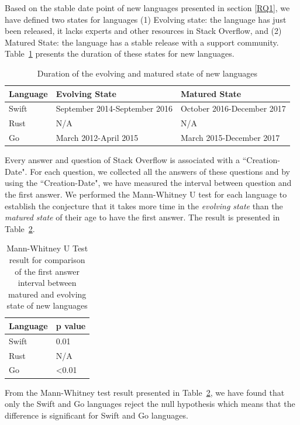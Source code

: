 {\color{blue}Based on the stable date point of new languages presented in section \ref{RQ1}, we have defined two states for languages (1) Evolving state: the language has just been released, it lacks experts and other resources in Stack Overflow, and (2) Matured State: the language has a stable release with a support community. Table~\ref{table:States of languages} presents the duration of these states for new languages.
\begin{table}
\caption{Duration of the evolving and matured state of new languages}
\begin{tabular}{|l|l|l|}
\hline
 Language & Evolving State& Matured State \\ \hline
 Swift & September 2014-September 2016 & October 2016-December 2017  \\ \hline
 Rust & N/A & N/A \\ \hline
 Go & March 2012-April 2015 & March 2015-December 2017 \\ \hline
\end{tabular}%
\label{table:States of languages}
\end{table}
Every answer and question of Stack Overflow is associated with a ``Creation-Date". For each question, we collected all the answers of these questions and by using the ``Creation-Date", we have measured the interval between question and the first answer.
We performed the Mann-Whitney U test for each language to establish the conjecture that it takes more time in the \emph{evolving state} than the \emph{matured state} of their age to have the first answer. The result is presented in Table~\ref{table:Mann-Whitney Test answer interval between states}.


\begin{table}
\centering
\caption{Mann-Whitney U Test result for comparison of the first answer interval between matured and evolving state of new languages}
\begin{tabular}{|l|l|}
\hline
 Language & p value \\ \hline
 Swift & 0.01  \\ \hline
 Rust & N/A \\ \hline
 Go &   \textless 0.01 \\ \hline
\end{tabular}%
\label{table:Mann-Whitney Test answer interval between states}
\end{table}

From the Mann-Whitney test result presented in Table~\ref{table:Mann-Whitney Test answer interval between states}, we have found that only the Swift and Go languages reject the null hypothesis which means that the difference is significant for Swift and Go languages.}
